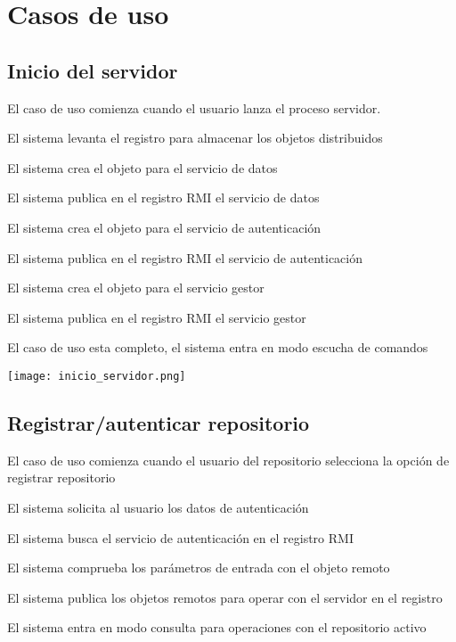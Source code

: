 \chapter{Casos de uso}

\section{Inicio del servidor}

\begin{compactenum}
	\item El caso de uso comienza cuando el usuario lanza el proceso servidor.
	\item El sistema levanta el registro para almacenar los objetos distribuidos
	\item El sistema crea el objeto para el servicio de datos
	\item El sistema publica en el registro RMI el servicio de datos
	\item El sistema crea el objeto para el servicio de autenticación
	\item El sistema publica en el registro RMI el servicio de autenticación
	\item El sistema crea el objeto para el servicio gestor
	\item El sistema publica en el registro RMI el servicio gestor
	\item El caso de uso esta completo, el sistema entra en modo escucha de comandos
\end{compactenum}
\texttt{[image: inicio\_servidor.png]}

\section{Registrar/autenticar repositorio}

\begin{compactenum}
	\item El caso de uso comienza cuando el usuario del repositorio selecciona la opción de registrar repositorio
	\item El sistema solicita al usuario los datos de autenticación
	\item El sistema busca el servicio de autenticación en el registro RMI
	\item El sistema comprueba los parámetros de entrada con el objeto remoto
	\item El sistema publica los objetos remotos para operar con el servidor en el registro
	\item El sistema entra en modo consulta para operaciones con el repositorio activo
\end{compactenum}

